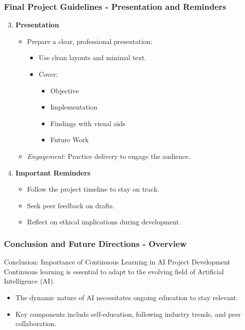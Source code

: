 \documentclass[aspectratio=169]{beamer}
\begin{document}
\begin{frame}[fragile]
    \frametitle{Final Project Guidelines - Presentation and Reminders}
    \begin{enumerate}
        \setcounter{enumi}{2}
        \item \textbf{Presentation}
            \begin{itemize}
                \item Prepare a clear, professional presentation:
                    \begin{itemize}
                        \item Use clean layouts and minimal text.
                        \item Cover:
                            \begin{itemize}
                                \item Objective
                                \item Implementation
                                \item Findings with visual aids
                                \item Future Work
                            \end{itemize}
                    \end{itemize}
                \item \textit{Engagement:} Practice delivery to engage the audience.
            \end{itemize}

        \item \textbf{Important Reminders}
            \begin{itemize}
                \item Follow the project timeline to stay on track.
                \item Seek peer feedback on drafts.
                \item Reflect on ethical implications during development.
            \end{itemize}
    \end{enumerate}
\end{frame}

\begin{frame}[fragile]
    \frametitle{Conclusion and Future Directions - Overview}
    \begin{block}{Conclusion: Importance of Continuous Learning in AI Project Development}
        Continuous learning is essential to adapt to the evolving field of Artificial Intelligence (AI).
        \begin{itemize}
            \item The dynamic nature of AI necessitates ongoing education to stay relevant.
            \item Key components include self-education, following industry trends, and peer collaboration.
        \end{itemize}
    \end{block}
\end{frame}
\end{document}
